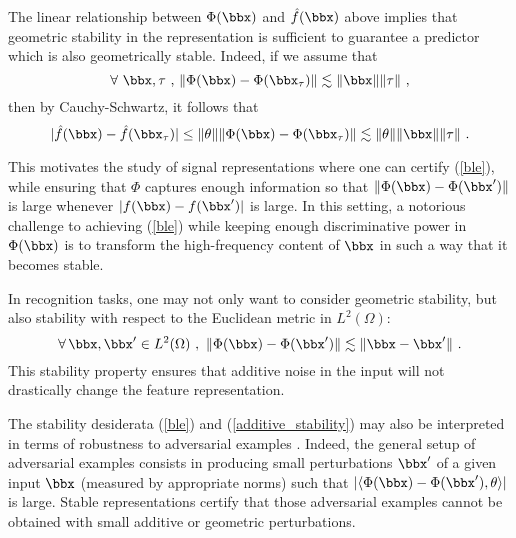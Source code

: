 
The linear relationship between $\Phi(\bbx)$ and $\hat{f}(\bbx)$ above implies that geometric stability in the representation is sufficient to guarantee a predictor which is also geometrically stable. Indeed, if we assume that
\begin{equation}
\label{ble}
\forall~\bbx,\tau~,\, \| \Phi(\bbx) - \Phi(\bbx_\tau) \| \lesssim \| \bbx \| \| \tau \|~,    
\end{equation}
then by Cauchy-Schwartz, it follows that 
$$| \hat{f}(\bbx) - \hat{f}(\bbx_\tau) | \leq \| \theta\| \| \Phi(\bbx) - \Phi(\bbx_\tau) \| \lesssim \| \theta\| \| \bbx \| \| \tau \|~.$$

This motivates the study of signal representations where one can certify (\ref{ble}), while ensuring that $\Phi$ captures enough information so that $\| \Phi(\bbx) - \Phi(\bbx') \|$ is large whenever $|f(\bbx) - f(\bbx')| $ is large.  
 In this setting, a notorious challenge to achieving (\ref{ble}) 
while keeping enough discriminative power in $\Phi(\bbx)$ 
is to transform the high-frequency content of $\bbx$ in such a way that it becomes stable. 



In recognition tasks, one may not only want to 
consider geometric stability, but also 
stability with respect to the Euclidean metric 
in $L^2(\Omega)$: 
\begin{equation}
\label{additive_stability}
\forall\, \bbx,\bbx' \in L^2(\Omega)~,~\| \Phi(\bbx) - \Phi(\bbx') \| \lesssim \| \bbx - \bbx' \| ~.
\end{equation}
This stability property ensures that additive noise 
in the input will not drastically change the feature 
representation. 

The stability desiderata (\ref{ble}) and (\ref{additive_stability}) may also be interpreted in terms of robustness to adversarial examples \cite{szegedy2013intriguing}. Indeed, the general 
setup of adversarial examples consists in producing 
small perturbations $\bbx'$ of a given input $\bbx$ (measured by appropriate norms) such that $| \langle \Phi(\bbx) - \Phi(\bbx'), \theta \rangle|$ is large. Stable representations certify that those adversarial examples cannot be obtained with small additive or geometric perturbations. 

